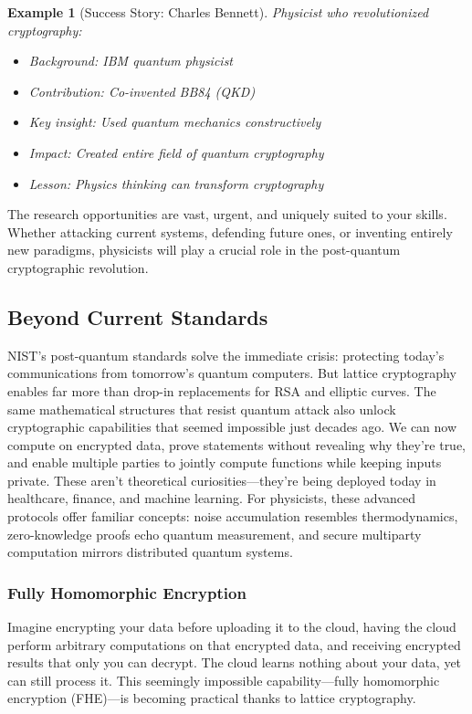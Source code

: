 \documentclass[11pt,a4paper]{article}
\newtheorem{example}{Example}
\begin{document}
\begin{example}[Success Story: Charles Bennett]
Physicist who revolutionized cryptography:
\begin{itemize}
    \item Background: IBM quantum physicist
    \item Contribution: Co-invented BB84 (QKD)
    \item Key insight: Used quantum mechanics constructively
    \item Impact: Created entire field of quantum cryptography
    \item Lesson: Physics thinking can transform cryptography
\end{itemize}
\end{example}

The research opportunities are vast, urgent, and uniquely suited to your skills. Whether attacking current systems, defending future ones, or inventing entirely new paradigms, physicists will play a crucial role in the post-quantum cryptographic revolution.

\subsection{Beyond Current Standards}
\label{sec:beyond-standards}

NIST's post-quantum standards solve the immediate crisis: protecting today's communications from tomorrow's quantum computers. But lattice cryptography enables far more than drop-in replacements for RSA and elliptic curves. The same mathematical structures that resist quantum attack also unlock cryptographic capabilities that seemed impossible just decades ago. We can now compute on encrypted data, prove statements without revealing why they're true, and enable multiple parties to jointly compute functions while keeping inputs private. These aren't theoretical curiosities—they're being deployed today in healthcare, finance, and machine learning. For physicists, these advanced protocols offer familiar concepts: noise accumulation resembles thermodynamics, zero-knowledge proofs echo quantum measurement, and secure multiparty computation mirrors distributed quantum systems.

\subsubsection{Fully Homomorphic Encryption}

Imagine encrypting your data before uploading it to the cloud, having the cloud perform arbitrary computations on that encrypted data, and receiving encrypted results that only you can decrypt. The cloud learns nothing about your data, yet can still process it. This seemingly impossible capability—fully homomorphic encryption (FHE)—is becoming practical thanks to lattice cryptography.
\end{document}
